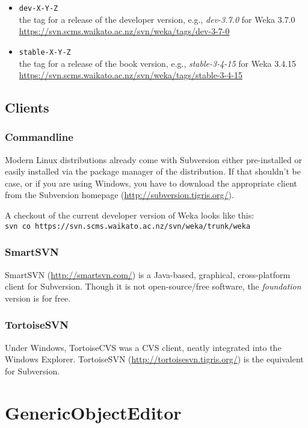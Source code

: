 \begin{itemize}
\item \verb=dev-X-Y-Z=\\the tag for a release of the developer version, e.g., \textit{dev-3.7.0} for Weka 3.7.0\\
\url{https://svn.scms.waikato.ac.nz/svn/weka/tags/dev-3-7-0}{}
\item \verb=stable-X-Y-Z=\\ the tag for a release of the book version, e.g., \textit{stable-3-4-15} for Weka 3.4.15\\
\url{https://svn.scms.waikato.ac.nz/svn/weka/tags/stable-3-4-15}{}
\end{itemize}

\subsection{Clients}
\subsubsection*{Commandline}
Modern Linux distributions already come with Subversion either
pre-installed or easily installed via the package manager of the
distribution. If that shouldn't be case, or if you are using Windows,
you have to download the appropriate client from the Subversion
homepage (\url{http://subversion.tigris.org/}{}).

\noindent A checkout of the current developer version of Weka looks like this:\\

\verb=svn co https://svn.scms.waikato.ac.nz/svn/weka/trunk/weka=

\subsubsection*{SmartSVN}
SmartSVN (\url{http://smartsvn.com/}{}) is a Java-based, graphical,
cross-platform client for Subversion. Though it is not
open-source/free software, the \textit{foundation} version is for free.

\subsubsection*{TortoiseSVN}
Under Windows, TortoiseCVS was a CVS client, neatly integrated into
the Windows Explorer. TortoiseSVN
(\url{http://tortoisesvn.tigris.org/}{}) is the equivalent for
Subversion.

\newpage
\section{GenericObjectEditor}
\label{genericobjecteditor}

